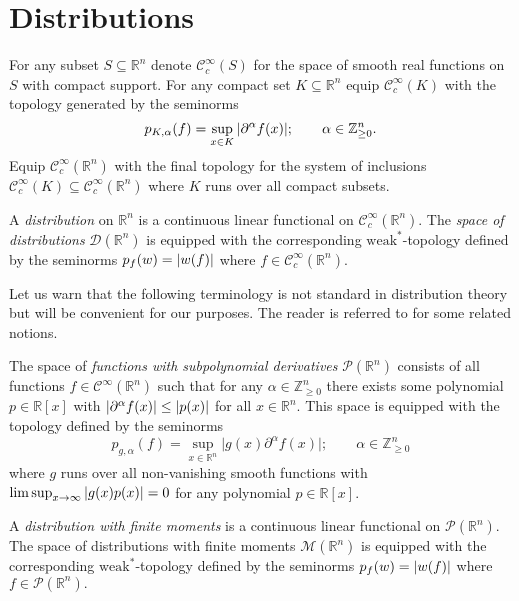 \section{Distributions}\label{sec: Distributions}
For any subset $S\subseteq \mathbb{R}^n$ denote $\mathcal{C}_c^\infty(S)$ for the space of smooth real functions on $S$ with compact support.
For any compact set $K\subseteq \mathbb{R}^n$ equip $\mathcal{C}^\infty_c(K)$ with the topology generated by the seminorms
$$p_{K,\alpha}(f) = \sup_{x\in K} \vert \partial^\alpha f(x) \vert;\qquad \alpha\in \mathbb{Z}_{\geq 0}^n.$$
Equip $\mathcal{C}_c^\infty(\mathbb{R}^n)$ with the final topology for the system of inclusions $\mathcal{C}_c^\infty(K)\subseteq \mathcal{C}_c^\infty(\mathbb{R}^n)$ where $K$ runs over all compact subsets.
\begin{definition}\label{def: Distribution}
  A {\it distribution} on $\mathbb{R}^n$ is a continuous linear functional on $\mathcal{C}_c^\infty(\mathbb{R}^n)$.
  The {\it space of distributions} $\mathcal{D}(\mathbb{R}^n)$ is equipped with the corresponding $\text{weak}^*$-topology defined by the seminorms $p_{f}(w) = \vert w(f) \vert$ where $f\in \mathcal{C}_c^\infty(\mathbb{R}^n).$
\end{definition}
Let us warn that the following terminology is not standard in distribution theory but will be convenient for our purposes.
The reader is referred to \cite[Chapter 4]{horvath2012topological} for some related notions.
\begin{definition}
  The space of {\it functions with subpolynomial derivatives} $\mathcal{P}(\mathbb{R}^n)$ consists of all functions $f\in \mathcal{C}^\infty(\mathbb{R}^n)$ such that for any $\alpha\in \mathbb{Z}_{\geq 0}^n$ there exists some polynomial $p\in \mathbb{R}[x]$ with $\vert \partial^\alpha f(x) \vert\leq \vert p(x) \vert$ for all $x\in\mathbb{R}^n$.
  This space is equipped with the topology defined by the seminorms $$p_{g,\alpha}(f) = \sup_{x\in \mathbb{R}^n} \vert g(x)\partial^\alpha f(x)\vert ;\qquad \alpha\in \mathbb{Z}_{\geq 0}^n$$
  where $g$ runs over all non-vanishing smooth functions with $\limsup_{x\to \infty} \vert g(x)p(x) \vert = 0$ for any polynomial $p\in \mathbb{R}[x]$.
\end{definition}
\begin{definition}\label{def: DistributionWithMoments}
  A {\it distribution with finite moments} is a continuous linear functional on $\mathcal{P}(\mathbb{R}^n)$.
  The space of distributions with finite moments $\mathcal{M}(\mathbb{R}^n)$ is equipped with the corresponding $\text{weak}^*$-topology defined by the seminorms  $p_{f}(w) = \vert w(f) \vert$ where $f\in \mathcal{P}(\mathbb{R}^n).$
\end{definition}
